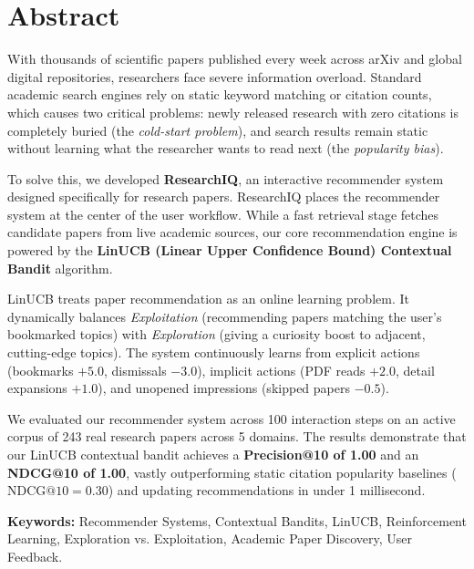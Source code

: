 \documentclass[11pt,a4paper]{article}
\begin{document}
\newpage

\section*{\centering Abstract}

With thousands of scientific papers published every week across arXiv and global digital repositories, researchers face severe information overload. Standard academic search engines rely on static keyword matching or citation counts, which causes two critical problems: newly released research with zero citations is completely buried (the \textit{cold-start problem}), and search results remain static without learning what the researcher wants to read next (the \textit{popularity bias}).

To solve this, we developed \textbf{ResearchIQ}, an interactive recommender system designed specifically for research papers. ResearchIQ places the recommender system at the center of the user workflow. While a fast retrieval stage fetches candidate papers from live academic sources, our core recommendation engine is powered by the \textbf{LinUCB (Linear Upper Confidence Bound) Contextual Bandit} algorithm. 

LinUCB treats paper recommendation as an online learning problem. It dynamically balances \textit{Exploitation} (recommending papers matching the user's bookmarked topics) with \textit{Exploration} (giving a curiosity boost to adjacent, cutting-edge topics). The system continuously learns from explicit actions (bookmarks $+5.0$, dismissals $-3.0$), implicit actions (PDF reads $+2.0$, detail expansions $+1.0$), and unopened impressions (skipped papers $-0.5$). 

We evaluated our recommender system across 100 interaction steps on an active corpus of 243 real research papers across 5 domains. The results demonstrate that our LinUCB contextual bandit achieves a \textbf{Precision@10 of 1.00} and an \textbf{NDCG@10 of 1.00}, vastly outperforming static citation popularity baselines ($\text{NDCG@10} = 0.30$) and updating recommendations in under 1 millisecond.

\vspace{0.5cm}
\textbf{Keywords:} Recommender Systems, Contextual Bandits, LinUCB, Reinforcement Learning, Exploration vs. Exploitation, Academic Paper Discovery, User Feedback.
\end{document}
